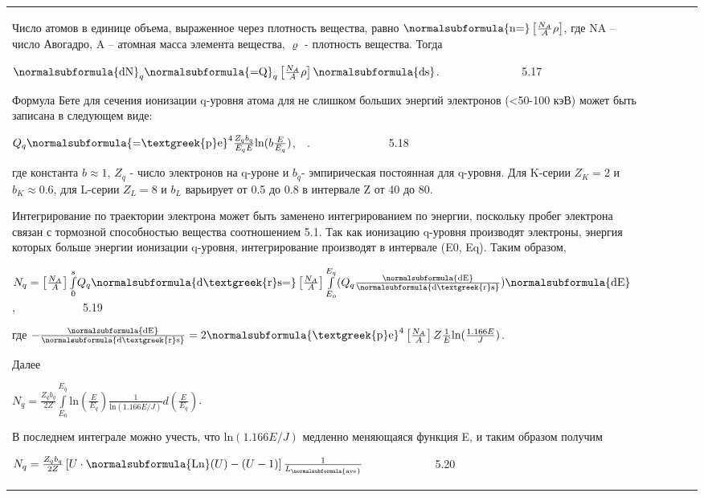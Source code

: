 \documentclass[a4paper,14pt, openany, twoside, draft]{extbook} %
\begin{document}
\begin{flushleft}
\begin{supertabular}{|m{1.7279999cm}|m{1.522cm}|m{1.522cm}|m{1.522cm}|m{1.744cm}|}
Число атомов в единице объема, выраженное через плотность вещества, равно  $\normalsubformula{\text{n=}}\left[\frac{N_A} A\rho \right]$, где NA – число Авогадро, A – атомная масса элемента вещества, ${\varrho}$ {}- плотность вещества. Тогда

 $\normalsubformula{\text{dN}}_q\normalsubformula{\text{=Q}}_q\left[\frac{N_A} A\rho \right]\normalsubformula{\text{ds}}$. \ \ \ \ \ \ \ \ \ \ \ \ \ \ 5.17

Формула Бете для сечения ионизации q{}-уровня атома для не слишком больших энергий электронов ({\textless}50-100 кэВ) может быть записана в следующем виде:

 $Q_q\normalsubformula{\text{=\textgreek{p}e}}^4\frac{Z_qb_q}{E_qE}\text{ln}(b\frac E{E_q})$,\ \ .\ \ \ \ \ \ \ \ \ \ \ \ \ \ 5.18

где константа  $b\approx 1$,  $Z_q$ - число электронов на q{}-уроне и  $b_q${}- эмпирическая постоянная для q{}-уровня. Для K{}-серии  $Z_K=2$ и  $b_K\approx 0.6$, для L{}-серии  $Z_L=8$ и  $b_L$ варьирует от 0.5 до 0.8 в интервале Z от 40 до 80.

Интегрирование по траектории электрона может быть заменено интегрированием по энергии, поскольку пробег электрона связан с тормозной способностью вещества соотношением 5.1. Так как ионизацию q{}-уровня производят электроны, энергия которых больше энергии ионизации q{}-уровня, интегрирование производят в интервале (E0, Eq). Таким образом,

 $N_q=\left[\frac{N_A} A\right]\overset s{\underset 0{\int }}Q_q\normalsubformula{\text{d\textgreek{r}s=}}\left[\frac{N_A} A\right]\overset{E_q}{\underset{E_o}{\int }}(Q_q\frac{\normalsubformula{\text{dE}}}{\normalsubformula{\text{d\textgreek{r}s}}})\normalsubformula{\text{dE}}$,\ \ \ \ \ \ \ \ \ \ \ \ 5.19

где  $-\frac{\normalsubformula{\text{dE}}}{\normalsubformula{\text{d\textgreek{r}s}}}=2\normalsubformula{\text{\textgreek{p}e}}^4\left[\frac{N_A} A\right]Z\frac 1 E\text{ln}(\frac{1.166E} J)$.

Далее

 $N_q=\frac{Z_qb_q}{2Z}\overset{E_q}{\underset{E_0}{\int }}\text{ln}(\frac E{E_q})\frac 1{\text{ln}(1.166E/J)}d(\frac E{E_q})$.

В последнем интеграле можно учесть, что  $\text{ln}(1.166E/J)$ медленно меняющаяся функция E, и таким образом получим

 $N_q=\frac{Z_qb_q}{2Z}\left[U\cdot \normalsubformula{\text{Ln}}(U)-(U-1)\right]\frac 1{L_{\normalsubformula{\text{ave}}}}$ \ \ \ \ \ \ \ \ \ \ \ \ 5.20


\end{supertabular}
\end{flushleft}
\end{document}
